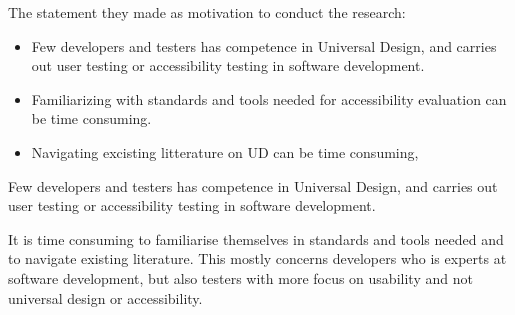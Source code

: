 The statement they made as motivation to conduct the research: 
\begin{itemize}
    \item Few developers and testers has competence in Universal Design, and carries out user testing or accessibility testing in software development.
    
    \item Familiarizing with standards and tools needed for accessibility evaluation can be time consuming.
    
    \item Navigating excisting litterature on UD can be time consuming,
\end{itemize}
\begin{displayquote}
    Few developers and testers has competence in Universal Design, and carries out user testing or accessibility testing in software development.

    It is time consuming to familiarise themselves in standards and tools needed and to navigate existing literature. This mostly concerns developers who is experts at software development, but also testers with more focus on usability and not universal design or accessibility.
\end{displayquote}
